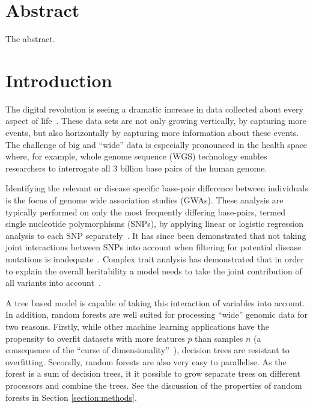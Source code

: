 \documentclass[10pt,letterpaper]{article}
\begin{document}
\clearpage

\section{Abstract}
The abstract.

\linenumbers

\section{Introduction}

The digital revolution is seeing a dramatic increase in data collected about every aspect of life~\cite{Loebbecke2015}.
These data sets are not only growing vertically, by capturing more events, but also horizontally by capturing
more information about these events.  The challenge of big and ``wide'' data is especially pronounced in the health
space where, for example, whole genome sequence (WGS) technology enables researchers to interrogate all 3 billion base pairs of the
human genome.

Identifying the relevant or disease specific base-pair difference between individuals is the focus of genome wide
association studies (GWAs).  These analysis are typically performed on only the most frequently differing base-pairs, termed
single nucleotide polymorphisms (SNPs), by applying linear or logistic regression analysis to each SNP separately~\cite{CCC2007}.  It has since been
demonstrated that not taking joint interactions between SNPs into account when filtering for potential disease mutations
is inadequate~\cite{Manolio2009}.  
Complex trait analysis has demonstrated that in order to explain the overall
heritability a model needs to take the joint contribution of all variants into account~\cite{Yang2011}.

A tree based model is capable of taking this interaction of variables
into account. In addition, random forests are well suited for
processing ``wide'' genomic data for two reasons.  Firstly, while other machine learning applications have the
propensity to overfit datasets with more features $p$ than samples $n$ (a consequence of the ``curse of
dimensionality''~\cite{Bauer2014, bellman1961adaptive}), decision trees are resistant to overfitting. 
Secondly, random forests are also very easy to parallelise. As the forest is a sum of decision trees, it it possible to grow
separate trees on different processors and combine the trees. See the
discussion of the properties of random forests in Section \ref{section:methods}.
\end{document}
